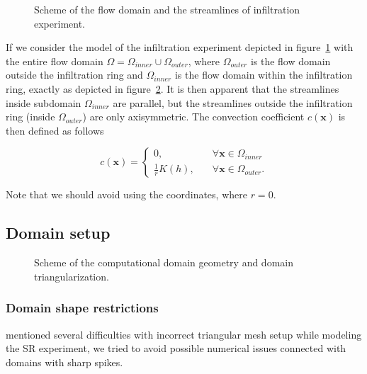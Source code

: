 \documentclass[review,times,3p,twocolumn,10pt]{elsarticle}
\newenvironment{lineq}
    {\begin{linenomath*}
    \begin{equation}
    }
    { 
    \end{equation} 
    \end{linenomath*}
    }
\renewcommand{\vec}{\mathbf}
\begin{document}
 \begin{figure}
\centering
{}
 \caption{Scheme of the flow domain and the streamlines of infiltration experiment. }
 \label{valecproudy}
\end{figure}

If we consider the model of the infiltration experiment depicted in figure~\ref{valecproudy} with the entire flow domain $\Omega=\Omega_{inner} \cup \Omega_{outer}$, where $\Omega_{outer}$ is the flow domain outside the infiltration ring and $\Omega_{inner}$ is the flow domain within the infiltration ring, exactly as depicted in figure~\ref{valec}. It is then apparent that the streamlines inside subdomain $\Omega_{inner}$ are parallel, but the streamlines outside the infiltration ring (inside $\Omega_{outer}$) are only axisymmetric. The convection coefficient $c(\vec{x})$ is then defined as follows
\begin{lineq}
\label{convect}
c(\vec{x}) = \begin{cases}
	     0 , \quad &\forall \vec{x} \in \Omega_{inner} \\
	     \frac{1}{r}K(h) , \quad &\forall \vec{x} \in \Omega_{outer}.
	    \end{cases}
\end{lineq}
Note that we should avoid using the coordinates, where $r=0$.


\subsection{Domain setup}%
\label{bccond}
 \begin{figure}
\centering
{}
 \caption{Scheme of the computational domain geometry and domain triangularization.}
 \label{valec}
\end{figure}


\subsubsection{Domain shape restrictions}

 \cite{Dusek} mentioned several difficulties with incorrect triangular mesh setup while modeling the SR experiment, we tried to avoid possible numerical issues connected with domains with sharp spikes.

\end{document}
